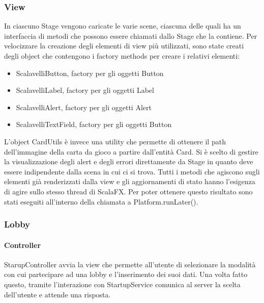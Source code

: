 \subsubsection{View}
In ciascuno Stage vengono caricate le varie scene, ciascuna delle quali ha un interfaccia di metodi che possono essere chiamati dallo Stage che la contiene.
\newline
Per velocizzare la creazione degli elementi di view più utilizzati, sono state creati degli object che contengono i factory methods per creare i relativi elementi:
\begin{itemize}
    \item ScalavelliButton, factory per gli oggetti Button
    \item ScalavelliLabel, factory per gli oggetti Label
    \item ScalavelliAlert, factory per gli oggetti Alert
    \item ScalavelliTextField, factory per gli oggetti Button
\end{itemize}
L’object CardUtils è invece una utility che permette di ottenere il path dell’immagine della carta da gioco a partire dall’entità Card.
Si è scelto di gestire la visualizzazione degli alert e degli errori direttamente da Stage in quanto deve essere indipendente dalla scena in cui ci si trova.
Tutti i metodi che agiscono sugli elementi già renderizzati dalla view e gli aggiornamenti di stato hanno l’esigenza di agire sullo stesso thread di ScalaFX. Per poter ottenere questo risultato sono stati eseguiti all’interno della chiamata a Platform.runLater().

\subsubsection{Lobby}

\paragraph{Controller}
StarupController avvia la view che permette all’utente di selezionare la modalità con cui partecipare ad una lobby e l’inserimento dei suoi dati.
Una volta fatto questo, tramite l’interazione con StartupService comunica al server la scelta dell’utente e attende una risposta.

